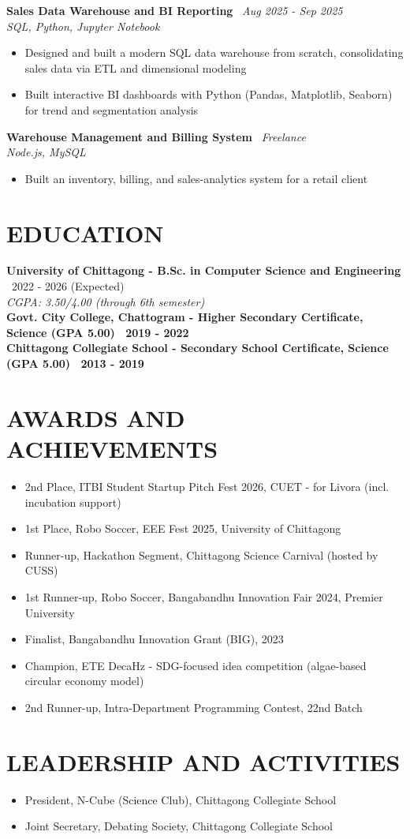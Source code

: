 \documentclass[10.5pt,a4paper]{article}
\newenvironment{tightitemize}{
  \begin{itemize}[leftmargin=15pt, itemsep=1pt, parsep=0pt, topsep=2pt]
}{
  \end{itemize}
}
\newcommand{\entry}[3]{%
  \textbf{#1} \textbar\ #2\\
  \textit{#3}%
}
\newcommand{\entrysimple}[2]{%
  \textbf{#1} \textbar\ \textit{#2}\\[1pt]
}
\newcommand{\entrybold}[2]{%
  \textbf{#1 \textbar\ #2}%
}
\begin{document}
\entrysimple{Sales Data Warehouse and BI Reporting}{Aug 2025 - Sep 2025}
\textit{SQL, Python, Jupyter Notebook}
\begin{tightitemize}
  \item Designed and built a modern SQL data warehouse from scratch, consolidating sales data via ETL and dimensional modeling
  \item Built interactive BI dashboards with Python (Pandas, Matplotlib, Seaborn) for trend and segmentation analysis
\end{tightitemize}

\entrysimple{Warehouse Management and Billing System}{Freelance}
\textit{Node.js, MySQL}
\begin{tightitemize}
  \item Built an inventory, billing, and sales-analytics system for a retail client
\end{tightitemize}

\section*{EDUCATION}
\entry{University of Chittagong - B.Sc. in Computer Science and Engineering}{2022 - 2026 (Expected)}{CGPA: 3.50/4.00 (through 6th semester)}\\[4pt]
\entrybold{Govt. City College, Chattogram - Higher Secondary Certificate, Science (GPA 5.00)}{2019 - 2022}\\[2pt]
\entrybold{Chittagong Collegiate School - Secondary School Certificate, Science (GPA 5.00)}{2013 - 2019}

\section*{AWARDS AND ACHIEVEMENTS}
\begin{tightitemize}
  \item 2nd Place, ITBI Student Startup Pitch Fest 2026, CUET - for Livora (incl. incubation support)
  \item 1st Place, Robo Soccer, EEE Fest 2025, University of Chittagong
  \item Runner-up, Hackathon Segment, Chittagong Science Carnival (hosted by CUSS)
  \item 1st Runner-up, Robo Soccer, Bangabandhu Innovation Fair 2024, Premier University
  \item Finalist, Bangabandhu Innovation Grant (BIG), 2023
  \item Champion, ETE DecaHz - SDG-focused idea competition (algae-based circular economy model)
  \item 2nd Runner-up, Intra-Department Programming Contest, 22nd Batch
\end{tightitemize}

\section*{LEADERSHIP AND ACTIVITIES}
\begin{tightitemize}
  \item President, N-Cube (Science Club), Chittagong Collegiate School
  \item Joint Secretary, Debating Society, Chittagong Collegiate School
\end{tightitemize}
\end{document}
